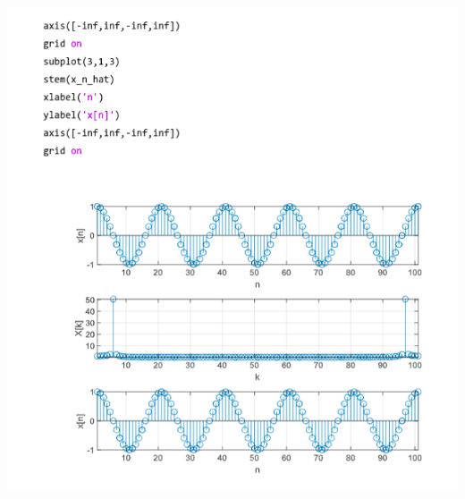 \documentclass[a4paper]{article}
\begin{document}
	
	\begin{center}
		\includegraphics[width=1\linewidth]{screenshot097}
	\end{center}
	
	
\end{document}
